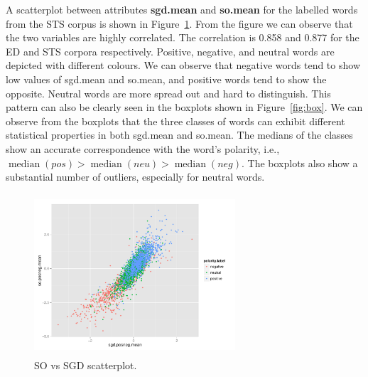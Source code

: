 \documentclass{sig-alternate}
\begin{document}
A scatterplot between attributes \textbf{sgd.mean} and \textbf{so.mean} for the labelled words from the STS corpus is shown in Figure~\ref{fig:sosgd}. From the figure we can observe that the two variables are highly correlated. The correlation is 0.858 and 0.877 for the ED and STS corpora respectively. Positive, negative, and neutral words are depicted with different colours. We can observe that negative words tend to show low values of sgd.mean and so.mean, and positive words tend to show the opposite. Neutral words are more spread out and hard to distinguish.  This pattern can also be clearly seen in the boxplots shown in Figure~\ref{fig:box}. We can observe from the boxplots that the three classes of words can exhibit different statistical properties in both sgd.mean and so.mean. The medians of the classes show an accurate correspondence with the word's polarity, i.e., $\operatorname{median}(pos) > \operatorname{median}(neu) > \operatorname{median}(neg)$. The boxplots also show a substantial number of outliers, especially for neutral words. 


\begin{figure}[htb]
	\centering
	 \includegraphics[width=7.5cm,height=6cm]{SGDSO.pdf}
	\caption{SO vs SGD scatterplot.}
	\label{fig:sosgd}
\end{figure}
\end{document}
